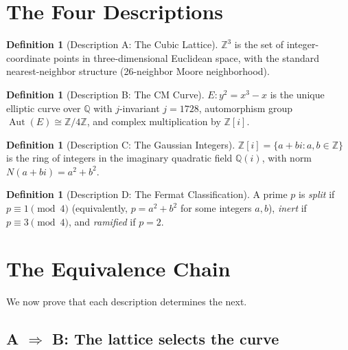 \documentclass[12pt]{article}
\theoremstyle{definition}
\newtheorem{definition}[theorem]{Definition}
\theoremstyle{remark}
\begin{document}
\section{The Four Descriptions}
\label{sec:four}

\begin{definition}[Description A: The Cubic Lattice]
$\mathbb{Z}^3$ is the set of integer-coordinate points in three-dimensional Euclidean space, with the standard nearest-neighbor structure (26-neighbor Moore neighborhood).
\end{definition}

\begin{definition}[Description B: The CM Curve]
$E\!: y^2 = x^3 - x$ is the unique elliptic curve over $\mathbb{Q}$ with $j$-invariant $j = 1728$, automorphism group $\operatorname{Aut}(E) \cong \mathbb{Z}/4\mathbb{Z}$, and complex multiplication by $\mathbb{Z}[i]$.
\end{definition}

\begin{definition}[Description C: The Gaussian Integers]
$\mathbb{Z}[i] = \{a + bi : a, b \in \mathbb{Z}\}$ is the ring of integers in the imaginary quadratic field $\mathbb{Q}(i)$, with norm $N(a+bi) = a^2 + b^2$.
\end{definition}

\begin{definition}[Description D: The Fermat Classification]
A prime $p$ is \emph{split} if $p \equiv 1 \pmod{4}$ (equivalently, $p = a^2 + b^2$ for some integers $a, b$), \emph{inert} if $p \equiv 3 \pmod{4}$, and \emph{ramified} if $p = 2$.
\end{definition}

\section{The Equivalence Chain}
\label{sec:chain}

We now prove that each description determines the next.

\subsection{A $\Rightarrow$ B: The lattice selects the curve}
\end{document}
